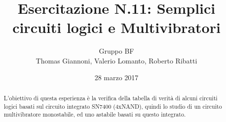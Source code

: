 \documentclass[a4paper,11pt]{article}
\author{Gruppo BF \\ Thomas Giannoni, Valerio Lomanto, Roberto Ribatti}
\title{Esercitazione N.11: Semplici circuiti logici e Multivibratori}
\date{28 marzo 2017}
\begin{document}
\maketitle
\begin{abstract}
	L'obiettivo di questa esperienza è la verifica della tabella di verità di alcuni circuiti logici basati sul circuito integrato SN7400 (4xNAND), quindi lo studio di un circuito multivibratore monostabile, ed uno astabile basati su questo integrato.
\end{abstract}





\end{document}
